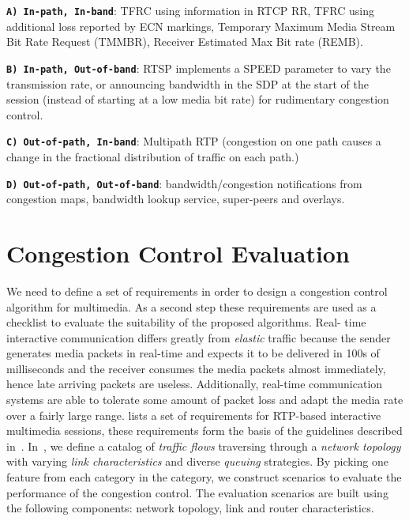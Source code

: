\textbf{\texttt{A) In-path, In-band}}: TFRC using information in RTCP RR, TFRC
using additional loss reported by ECN markings, Temporary Maximum Media Stream
Bit Rate Request (TMMBR), Receiver Estimated Max Bit rate (REMB).

\textbf{\texttt{B) In-path, Out-of-band}}: RTSP implements a SPEED parameter
to vary the transmission rate, or announcing bandwidth in the SDP at the start
of the session (instead of starting at a low media bit rate) for rudimentary
congestion control.

\textbf{\texttt{C) Out-of-path, In-band}}: Multipath RTP (congestion on one
path causes a change in the fractional distribution of traffic on each path.)

\textbf{\texttt{D) Out-of-path, Out-of-band}}: bandwidth/congestion
notifications from congestion maps, bandwidth lookup service, super-peers and
overlays.




\section{Congestion Control Evaluation}
\label{fw.cc.eval}

We need to define a set of requirements in order to design a congestion
control algorithm for multimedia. As a second step these requirements are used
as a checklist to evaluate the suitability of the proposed algorithms. Real-
time interactive communication differs greatly from \emph{elastic} traffic
because the sender generates media packets in real-time and expects it to be
delivered in 100s of milliseconds and the receiver consumes the media packets
almost immediately, hence late arriving packets are useless. Additionally,
real-time communication systems are able to tolerate some amount of packet
loss and adapt the media rate over a fairly large range.
\cite{draft.rmcat.req} lists a set of requirements for RTP-based interactive
multimedia sessions, these requirements form the basis of the guidelines
described in~\cite{draft.rmcat.evaluate}. In~\cite{draft.rmcat.evaluate}, we
define a catalog of \emph{traffic flows} traversing through a \emph{network
topology} with varying \emph{link characteristics} and diverse \emph{queuing}
strategies. By picking one feature from each category in the category, we
construct scenarios to evaluate the performance of the congestion control. The
evaluation scenarios are built using the following components: network
topology, link and router characteristics.

